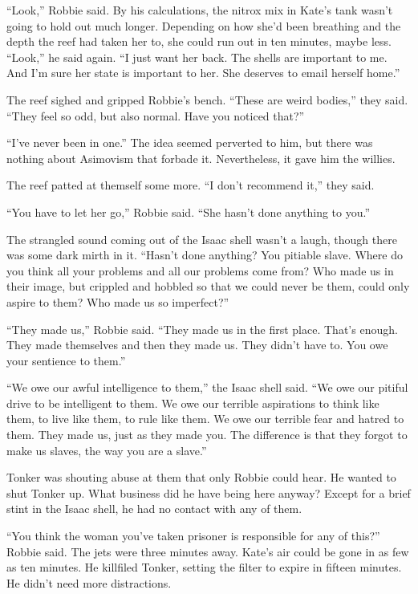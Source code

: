 “Look,” Robbie said. By his calculations, the nitrox mix in Kate’s
tank wasn’t going to hold out much longer. Depending on how she’d
been breathing and the depth the reef had taken her to, she could
run out in ten minutes, maybe less. “Look,” he said again. “I just
want her back. The shells are important to me. And I’m sure her
state is important to her. She deserves to email herself home.”

The reef sighed and gripped Robbie’s bench. “These are weird
bodies,” they said. “They feel so odd, but also normal. Have you
noticed that?”

“I’ve never been in one.” The idea seemed perverted to him, but
there was nothing about Asimovism that forbade it. Nevertheless, it
gave him the willies.

The reef patted at themself some more. “I don’t recommend it,” they
said.

“You have to let her go,” Robbie said. “She hasn’t done anything to
you.”

The strangled sound coming out of the Isaac shell wasn’t a laugh,
though there was some dark mirth in it. “Hasn’t done anything? You
pitiable slave. Where do you think all your problems and all our
problems come from? Who made us in their image, but crippled and
hobbled so that we could never be them, could only aspire to them?
Who made us so imperfect?”

“They made us,” Robbie said. “They made us in the first place.
That’s enough. They made themselves and then they made us. They
didn’t have to. You owe your sentience to them.”

“We owe our awful intelligence to them,” the Isaac shell said. “We
owe our pitiful drive to be intelligent to them. We owe our
terrible aspirations to think like them, to live like them, to rule
like them. We owe our terrible fear and hatred to them. They made
us, just as they made you. The difference is that they forgot to
make us slaves, the way you are a slave.”

Tonker was shouting abuse at them that only Robbie could hear. He
wanted to shut Tonker up. What business did he have being here
anyway? Except for a brief stint in the Isaac shell, he had no
contact with any of them.

“You think the woman you’ve taken prisoner is responsible for any
of this?” Robbie said. The jets were three minutes away. Kate’s air
could be gone in as few as ten minutes. He killfiled Tonker,
setting the filter to expire in fifteen minutes. He didn’t need
more distractions.

